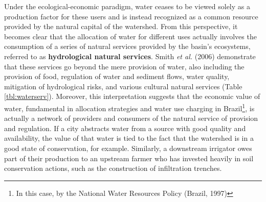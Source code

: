 \documentclass[./main_en.tex]{subfiles}
\begin{document}
\par Under the ecological-economic paradigm, water ceases to be viewed solely as a production factor for these users and is instead recognized as a common resource provided by the natural capital of the watershed. From this perspective, it becomes clear that the allocation of water for different uses actually involves the consumption of a series of natural services provided by the basin's ecosystems, referred to as \textbf{hydrological natural services}. Smith \textit{et al.} (2006) \cite{Smith2006a} demonstrate that these services go beyond the mere provision of water, also including the provision of food, regulation of water and sediment flows, water quality, mitigation of hydrological risks, and various cultural natural services (Table \ref{tbl:waterserv}). Moreover, this interpretation suggests that the economic value of water, fundamental in allocation strategies and water use charging in Brazil\footnote{In this case, by the National Water Resources Policy (Brazil, 1997)}, is actually a network of providers and consumers of the natural service of provision and regulation. If a city abstracts water from a source with good quality and availability, the value of that water is tied to the fact that the watershed is in a good state of conservation, for example. Similarly, a downstream irrigator owes part of their production to an upstream farmer who has invested heavily in soil conservation actions, such as the construction of infiltration trenches.
\end{document}
